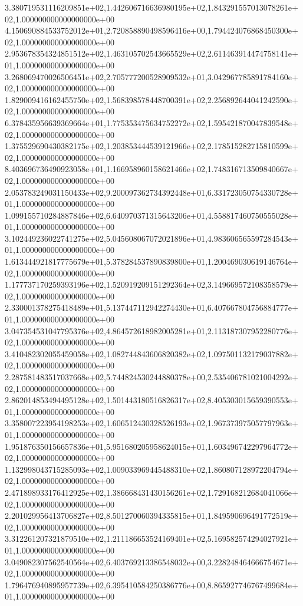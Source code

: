 3.380719531116209851e+02,1.442606716636980195e+02,1.843291557013078261e+02,1.000000000000000000e+00
4.150690884533752012e+01,2.720858890498596416e+00,1.794424076868450300e+02,1.000000000000000000e+00
2.953678354324851512e+02,1.463105702543665529e+02,2.611463914474758141e+01,1.000000000000000000e+00
3.268069470026506451e+02,2.705777200528909532e+01,3.042967785891784160e+02,1.000000000000000000e+00
1.829009416162455750e+02,1.568398578448700391e+02,2.256892644041242590e+02,1.000000000000000000e+00
6.378435956639369664e+01,1.775353475634752272e+02,1.595421870047839548e+02,1.000000000000000000e+00
1.375529690430382175e+02,1.203853444539121966e+02,2.178515282715810599e+02,1.000000000000000000e+00
8.403696736490923058e+01,1.166958960158621466e+02,1.748316713509840667e+02,1.000000000000000000e+00
2.053783249031150433e+02,9.200097362734392448e+01,6.331723050754330728e+01,1.000000000000000000e+00
1.099155710284887846e+02,6.640970371315643206e+01,4.558817460750555028e+01,1.000000000000000000e+00
3.102449236022741275e+02,5.045608067072021896e+01,4.983606565597284543e+01,1.000000000000000000e+00
1.613444921817775679e+01,5.378284537890839800e+01,1.200469030619146764e+02,1.000000000000000000e+00
1.177737170259393196e+02,1.520919209151292364e+02,3.149669572108358579e+02,1.000000000000000000e+00
2.330001378275418489e+01,5.137447112942274430e+01,6.407667804756884777e+01,1.000000000000000000e+00
3.047354531047795376e+02,4.864572618982005281e+01,2.113187307952280776e+02,1.000000000000000000e+00
3.410482302055459058e+02,1.082744843606820382e+02,1.097501132179037882e+02,1.000000000000000000e+00
2.287581483517037668e+02,5.744824530244880378e+00,2.535406781021004292e+02,1.000000000000000000e+00
2.862014853494495128e+02,1.501443180516826317e+02,8.405303015659390553e+01,1.000000000000000000e+00
3.358007223954198253e+02,1.606512430328526193e+02,1.967373975057797963e+01,1.000000000000000000e+00
1.951876350156657836e+01,5.951680205958624015e+01,1.603496742297964772e+02,1.000000000000000000e+00
1.132998043715285093e+02,1.009033969445488310e+02,1.860807128972204794e+02,1.000000000000000000e+00
2.471898933176412925e+02,1.386668431430156261e+02,1.729168212684041066e+02,1.000000000000000000e+00
2.201029956413706827e+02,8.501270060394335815e+01,1.849590696491772519e+02,1.000000000000000000e+00
3.312261207321879510e+02,1.211186653524169401e+02,5.169582574294027921e+01,1.000000000000000000e+00
3.049082307562540564e+02,6.403769213386548032e+00,3.228248464666754671e+02,1.000000000000000000e+00
1.796476940895957739e+02,6.395410584250386776e+00,8.865927746767499684e+01,1.000000000000000000e+00
